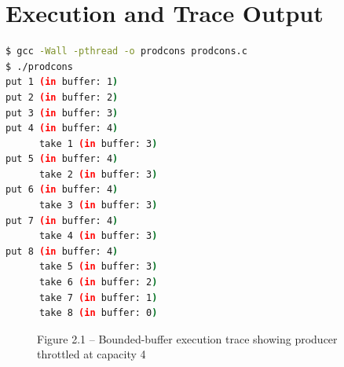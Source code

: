 \documentclass[12pt,a4paper]{report}
\numberwithin{equation}{chapter}
\numberwithin{figure}{chapter}
\numberwithin{table}{chapter}
\begin{document}
\section{Execution and Trace Output}
\begin{lstlisting}[language=bash]
$ gcc -Wall -pthread -o prodcons prodcons.c
$ ./prodcons
put 1 (in buffer: 1)
put 2 (in buffer: 2)
put 3 (in buffer: 3)
put 4 (in buffer: 4)
      take 1 (in buffer: 3)
put 5 (in buffer: 4)
      take 2 (in buffer: 3)
put 6 (in buffer: 4)
      take 3 (in buffer: 3)
put 7 (in buffer: 4)
      take 4 (in buffer: 3)
put 8 (in buffer: 4)
      take 5 (in buffer: 3)
      take 6 (in buffer: 2)
      take 7 (in buffer: 1)
      take 8 (in buffer: 0)
\end{lstlisting}

\begin{figure}[H]
\centering
\caption{Figure 2.1 -- Bounded-buffer execution trace showing producer throttled at capacity 4}
\end{figure}
\end{document}
